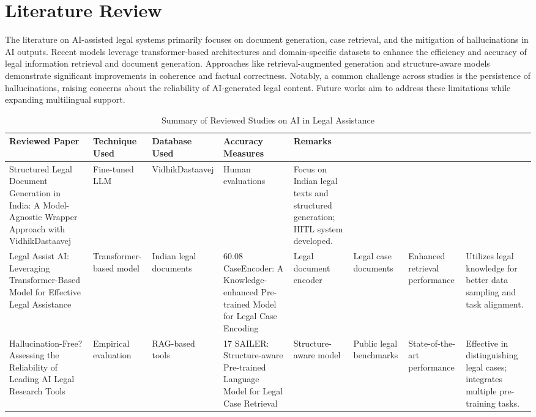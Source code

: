 \documentclass[conference]{IEEEtran}
\begin{document}
\section{Literature Review}
\hspace{}The literature on AI-assisted legal systems primarily focuses on document generation, case retrieval, and the mitigation of hallucinations in AI outputs. Recent models leverage transformer-based architectures and domain-specific datasets to enhance the efficiency and accuracy of legal information retrieval and document generation. Approaches like retrieval-augmented generation and structure-aware models demonstrate significant improvements in coherence and factual correctness. Notably, a common challenge across studies is the persistence of hallucinations, raising concerns about the reliability of AI-generated legal content. Future works aim to address these limitations while expanding multilingual support.


\begin{table}[h]
\centering
\begin{tabular}{|p{1.3cm}|p{1.3cm}|p{1.3cm}|p{1.3cm}|p{1.3cm}|}
\hline
\textbf{Reviewed Paper} & \textbf{Technique Used} & \textbf{Database Used} & \textbf{Accuracy Measures} & \textbf{Remarks} \\
\hline
Structured Legal Document Generation in India: A Model-Agnostic Wrapper Approach with VidhikDastaavej & Fine-tuned LLM & VidhikDastaavej & Human evaluations & Focus on Indian legal texts and structured generation; HITL system developed. \\
\hline
Legal Assist AI: Leveraging Transformer-Based Model for Effective Legal Assistance & Transformer-based model & Indian legal documents & 60.08%
\hline
CaseEncoder: A Knowledge-enhanced Pre-trained Model for Legal Case Encoding & Legal document encoder & Legal case documents & Enhanced retrieval performance & Utilizes legal knowledge for better data sampling and task alignment. \\
\hline
Hallucination-Free? Assessing the Reliability of Leading AI Legal Research Tools & Empirical evaluation & RAG-based tools & 17%
\hline
SAILER: Structure-aware Pre-trained Language Model for Legal Case Retrieval & Structure-aware model & Public legal benchmarks & State-of-the-art performance & Effective in distinguishing legal cases; integrates multiple pre-training tasks. \\
\hline
\end{tabular}
\caption{Summary of Reviewed Studies on AI in Legal Assistance}
\end{table}
\end{document}
